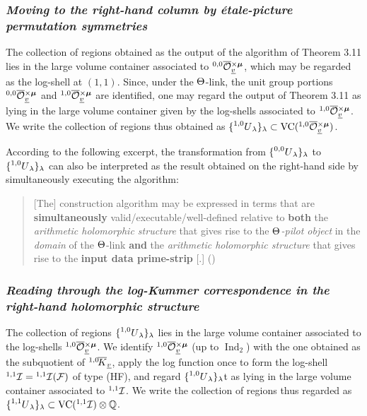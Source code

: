 \documentclass[12pt, reqno, a4paper]{amsart}
\def\udl#1{\underline{#1}} %
\def\bQ{\mathbb{Q}} %
\def\cF{{\mathcal{F}}}
\def\uv{\udl{v}} %
\DeclareMathOperator{\VC}{VC}
\DeclareMathOperator{\Ind}{Ind}
\begin{document}
\subsubsection{\emph{Moving to the right-hand column by \'etale-picture permutation symmetries}}
The collection of regions obtained as the output of the algorithm of Theorem 3.11 lies in the large volume container associated to $\oOOxmu[0,0]_{\uv}$, which may be regarded as the log-shell at $(1, 1)$. 
Since, under the $\Th$-link, the unit group portions $\oOOxmu[0,0]_{\uv}$ and $\oOOxmu[1,0]_{\uv}$ are identified, one may regard the output of Theorem 3.11 as lying in the large volume container given by the log-shells associated to $\oOOxmu[1,0]_{\uv}$.
We write the collection of regions thus obtained as $\{\prescript{1,0}{}{U}_{\lambda}\}_{\lambda}\subset\VC(\oOOxmu[1,0]_{\uv})$.

\begin{rem}\label{rem:APT}
According to the following excerpt, the transformation from $\{\prescript{0,0}{}{U}_{\lambda}\}_{\lambda}$ to $\{\prescript{1,0}{}{U}_{\lambda}\}_{\lambda}$ can also be interpreted as the result obtained on the right-hand side by simultaneously executing the algorithm:

\medskip
\begin{quote}
[The] construction algorithm may be expressed in terms that are
{\bf simultaneously} valid/executable/well-defined relative to {\bf both}
the {\it arithmetic holomorphic structure} that gives rise to the {\it
$\Th$-pilot object} in the {\it domain} of the $\Th$-link {\bf and} the
{\it arithmetic holomorphic structure} that gives rise to the {\bf input
data prime-strip} [.] (\cite[Rem.\ 3.11.1(v), p.\ 585]{MR4225475})
\end{quote}
\end{rem}


\subsubsection{\emph{Reading through the log-Kummer correspondence in the right-hand holomorphic structure}}
The collection of regions $\{\prescript{1,0}{}{U}_{\lambda}\}_{\lambda}$ lies in the large volume container associated to the log-shells $\oOOxmu[1,0]_{\uv}$.
We identify $\oOOxmu[1,0]_{\uv}$ (up to $\Ind_2$) with the one obtained as the subquotient of $\oK[1,0]_{\uv}$, apply the log function once to form the log-shell $\LS[1,1]=\LS[1,1](\cF)$ of type (HF), and regard $\{\prescript{1,0}{}{U}_{\lambda}\}_{\lambda}$t as lying in the large volume container associated to $\LS[1,1]$.
We write the collection of regions thus regarded as $\{\prescript{1,1}{}{U}_{\lambda}\}_{\lambda}\subset\VC(\LS[1,1])\otimes\bQ$.
\end{document}
